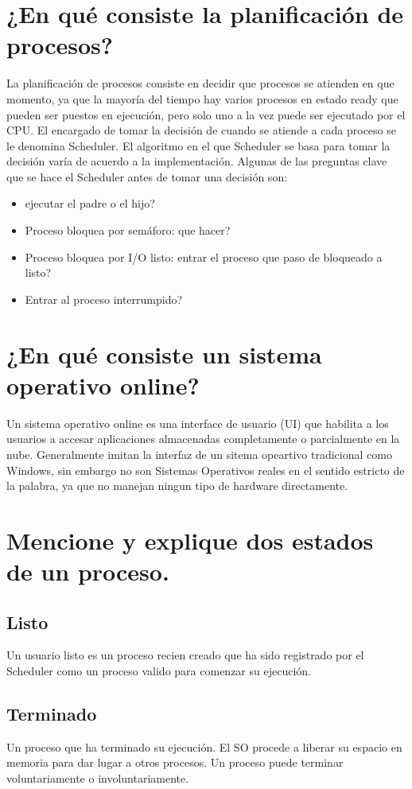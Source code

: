 \documentclass{article}
\begin{document}
\section{¿En qué consiste la planificación de procesos?}
La planificación de procesos consiste en decidir que procesos se atienden en que momento, ya que la mayoría del tiempo hay varios procesos en estado ready que pueden ser puestos en ejecución, pero solo uno a la vez puede ser ejecutado por el CPU. El encargado de tomar la decisión de cuando se atiende a cada proceso se le denomina Scheduler. El algoritmo en el que Scheduler se basa para tomar la decisión varía de acuerdo a la implementación. Algunas de las preguntas clave que se hace el Scheduler antes de tomar una decisión son:
\begin{itemize}
	\item ejecutar el padre o el hijo?
	\item Proceso bloquea por semáforo: que hacer? 
	\item Proceso bloquea por I/O listo: entrar el proceso que paso de bloqueado a listo? 
	\item  Entrar al proceso interrumpido? 
\end{itemize}
\section{¿En qué consiste un sistema operativo online?}
Un sistema operativo online es una interface de usuario (UI) que habilita a los usuarios a accesar aplicaciones almacenadas completamente o parcialmente en la nube. Generalmente imitan la interfaz de un sitema opeartivo tradicional como Windows, sin embargo no son Sistemas Operativos reales en el sentido estricto de la palabra, ya que no manejan ningun tipo de hardware directamente.

\section{Mencione y explique dos estados de un proceso.}
	\subsection{Listo}
		Un usuario listo es un proceso recien creado que ha sido registrado por el Scheduler como un proceso valido para comenzar su ejecución.
	\subsection{Terminado}
		Un proceso que ha terminado su ejecución. El SO procede a liberar su espacio en memoria para dar lugar a otros procesos. Un proceso puede terminar voluntariamente o involuntariamente.
			
\end{document}
